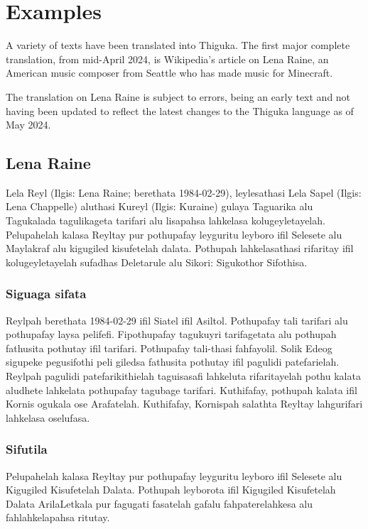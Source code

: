 \newpage
\section{Examples}
A variety of texts have been translated into Thiguka. The first major complete translation, from mid-April 2024, is Wikipedia's article on Lena Raine, an American music composer from Seattle who has made music for Minecraft.

The translation on Lena Raine is subject to errors, being an early text and not having been updated to reflect the latest changes to the Thiguka language as of May 2024.

\subsection{Lena Raine}
Lela Reyl (Ilgis: Lena Raine; berethata 1984-02-29), leylesathasi Lela Sapel (Ilgis: Lena Chappelle) aluthasi Kureyl (Ilgis: Kuraine) gulaya Taguarika alu Tagukalada tagulikageta tarifari alu lisapahsa lahkelasa kolugeyletayelah.
Pelupahelah kalasa Reyltay pur pothupafay leyguritu leyboro ifil Selesete alu Maylakraf alu kigugiled kisufetelah dalata.
Pothupah lahkelasathasi rifaritay ifil kolugeyletayelah sufadhas Deletarule alu Sikori: Sigukothor Sifothisa. 

\subsubsection{Siguaga sifata}
Reylpah berethata 1984-02-29 ifil Siatel ifil Asiltol.
Pothupafay tali tarifari alu pothupafay laysa pelifefi.
Fipothupafay tagukuyri tarifagetata alu pothupah fathusita pothutay ifil tarifari.
Pothupafay tali-thasi fahfayolil.
Solik Edeog sigupeke pegusifothi peli giledsa fathusita pothutay ifil pagulidi patefarielah.
Reylpah pagulidi patefarikithielah taguisasafi lahkeluta rifaritayelah pothu kalata aludhete lahkelata pothupafay tagubage tarifari.
Kuthifafay, pothupah kalata ifil Kornis ogukala ose Arafatelah.
Kuthifafay, Kornispah salathta Reyltay lahgurifari lahkelasa oselufasa.

\subsubsection{Sifutila}
Pelupahelah kalasa Reyltay pur pothupafay leyguritu leyboro ifil Selesete alu Kigugiled Kisufetelah Dalata. 
Pothupah leyborota ifil Kigugiled Kisufetelah Dalata ArilaLetkala pur fagugati fasatelah gafalu fahpaterelahkesa alu fahlahkelapahsa ritutay.

